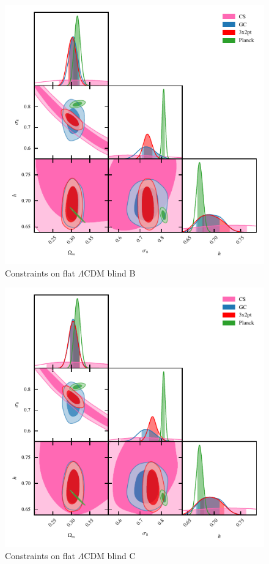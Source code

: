 
\begin{figure}
	\begin{center}
		\includegraphics[width=\columnwidth]{Parameter_Plots/cosmology/omegam_sigma8_h_blind_B}
		\caption{Constraints on flat $\Lambda$CDM blind B}
		\label{fig:cosmology-paramsB}
	\end{center}
\end{figure}

\begin{figure}
	\begin{center}
		\includegraphics[width=\columnwidth]{Parameter_Plots/cosmology/omegam_sigma8_h_blind_C}
		\caption{Constraints on flat $\Lambda$CDM blind C}
		\label{fig:cosmology-paramsC}
	\end{center}
\end{figure}


